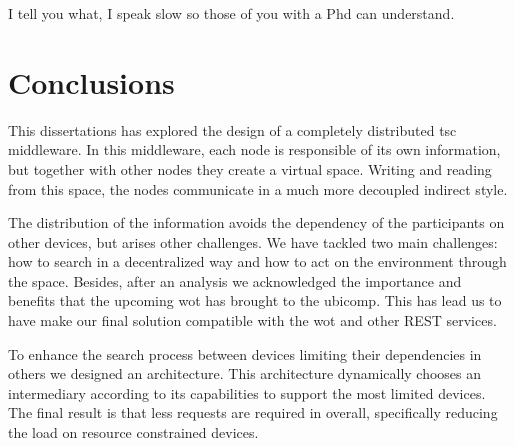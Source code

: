 

\begin{savequote}[50mm]
I tell you what, I speak slow so those of you with a Phd can understand.
\end{savequote}


\chapter{Conclusions}
\label{cha:conclusions}
\newcommand{\pathchapseven}{7_conclusion}


\ifpdf
    \graphicspath{{\pathchapseven/figures/PNG/}{\pathchapseven/figures/PDF/}{\pathchapseven/figures/}}
\else
    \graphicspath{{\pathchapseven/figures/EPS/}{\pathchapseven/figures/}}
\fi




This dissertations has explored the design of a completely distributed \ac{tsc} middleware.
In this middleware, each node is responsible of its own information, but together with other nodes they create a virtual space. %
Writing and reading from this space, the nodes communicate in a much more decoupled indirect style.

The distribution of the information avoids the dependency of the participants on other devices, but arises other challenges.
We have tackled two main challenges: how to search in a decentralized way and how to act on the environment through the space.
Besides, after an analysis we acknowledged the importance and benefits that the upcoming \ac{wot} has brought to the \acl{ubicomp}.
This has lead us to have make our final solution compatible with the \ac{wot} and other REST services.

To enhance the search process between devices limiting their dependencies in others we designed an architecture.
This architecture dynamically chooses an intermediary according to its capabilities to support the most limited devices.
The final result is that less requests are required in overall, specifically reducing the load on resource constrained devices.

